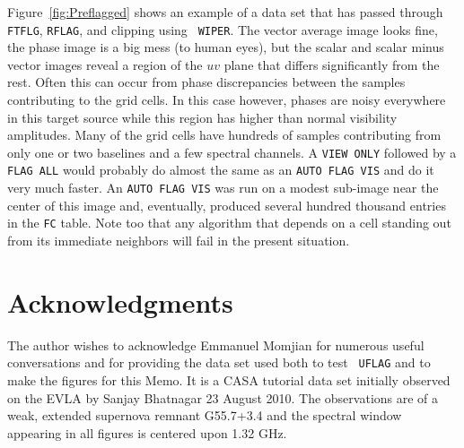 \documentclass[twoside]{article}
\begin{document}
Figure~\ref{fig:Preflagged} shows an example of a data set that has
passed through {\tt FTFLG}, {\tt RFLAG}, and clipping using {\tt
  WIPER}\@.  The vector average image looks fine, the phase image
is a big mess (to human eyes), but the scalar and scalar minus vector
images reveal a region of the $uv$ plane that differs significantly
from the rest.  Often this can occur from phase discrepancies between
the samples contributing to the grid cells.  In this case however,
phases are noisy everywhere in this target source while this region
has higher than normal visibility amplitudes.  Many of the grid cells
have hundreds of samples contributing from only one or two baselines
and a few spectral channels.  A {\tt VIEW ONLY} followed by a {\tt
  FLAG ALL} would probably do almost the same as an {\tt AUTO FLAG
  VIS} and do it very much faster.  An {\tt AUTO FLAG VIS} was run on
a modest sub-image near the center of this image and, eventually,
produced several hundred thousand entries in the {\tt FC} table.  Note
too that any algorithm that depends on a cell standing out from its
immediate neighbors will fail in the present situation.

\section{Acknowledgments}

The author wishes to acknowledge Emmanuel Momjian for numerous useful
conversations and for providing the data set used both to test {\tt
  UFLAG} and to make the figures for this Memo.  It is a CASA tutorial
data set initially observed on the EVLA by Sanjay Bhatnagar 23 August
2010.  The observations are of a weak, extended supernova remnant
G55.7+3.4 and the spectral window appearing in all figures is centered
upon 1.32 GHz.
\end{document}
